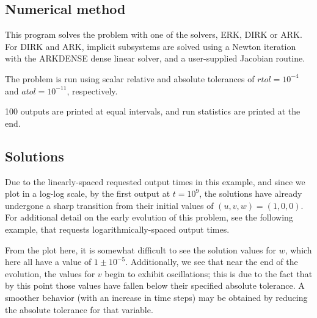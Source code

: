\documentclass[letterpaper,10pt,english]{sphinxmanual}
\begin{document}
\subsection{Numerical method}
\label{c_serial:id11}
This program solves the problem with one of the solvers, ERK, DIRK or
ARK.  For DIRK and ARK, implicit subsystems are solved using a Newton
iteration with the ARKDENSE dense linear solver, and a user-supplied
Jacobian routine.

The problem is run using scalar relative and absolute tolerances of
$rtol=10^{-4}$ and $atol=10^{-11}$, respectively.

100 outputs are printed at equal intervals, and run statistics are
printed at the end.


\subsection{Solutions}
\label{c_serial:id12}
Due to the linearly-spaced requested output times in this example, and
since we plot in a log-log scale, by the first output at
$t=10^9$, the solutions have already undergone a sharp
transition from their initial values of $(u,v,w) = (1, 0, 0)$.
For additional detail on the early evolution of this problem, see the
following example, that requests logarithmically-spaced output times.

From the plot here, it is somewhat difficult to see the solution
values for $w$, which here all have a value of
$1\pm10^{-5}$.  Additionally, we see that near the end of the
evolution, the values for $v$ begin to exhibit oscillations;
this is due to the fact that by this point those values have fallen
below their specified absolute tolerance.  A smoother behavior (with
an increase in time steps) may be obtained by reducing the absolute
tolerance for that variable.
\begin{figure}[htbp]
\centering

\end{figure}
\end{document}
